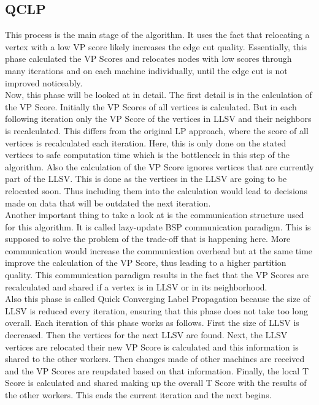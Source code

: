 \documentclass[acmsmall,nonacm,screen,review]{acmart}
\begin{document}
\subsection{QCLP}
This process is the main stage of the algorithm. It uses the fact that relocating a vertex with a low VP score likely increases the edge cut quality. Essentially, this phase calculated the VP Scores and relocates nodes with low scores through many iterations and on each machine individually, until the edge cut is not improved noticeably.\\
Now, this phase will be looked at in detail. The first detail is in the calculation of the VP Score. Initially the VP Scores of all vertices is calculated. But in each following iteration only the VP Score of the vertices in LLSV and their neighbors is recalculated. This differs from the original LP approach, where the score of all vertices is recalculated each iteration. Here, this is only done on the stated vertices to safe computation time which is the bottleneck in this step of the algorithm. Also the calculation of the VP Score ignores vertices that are currently part of the LLSV. This is done as the vertices in the LLSV are going to be relocated soon. Thus including them into the calculation would lead to decisions made on data that will be outdated the next iteration.\\
Another important thing to take a look at is the communication structure used for this algorithm. It is called lazy-update BSP communication paradigm. This is supposed to solve the problem of the trade-off that is happening here. More communication would increase the communication overhead but at the same time improve the calculation of the VP Score, thus leading to a higher partition quality. This communication paradigm  results in the fact that the VP Scores are recalculated and shared if a vertex is in LLSV or in its neighborhood.\\
Also this phase is called Quick Converging Label Propagation because the size of LLSV is reduced every iteration, ensuring that this phase does not take too long overall. Each iteration of this phase works as follows. First the size of LLSV is decreased. Then the vertices for the next LLSV are found. Next, the LLSV vertices are relocated their new VP Score is calculated and this information is shared to the other workers. Then changes made of other machines are received and the VP Scores are reupdated based on that information. Finally, the local T Score is calculated and shared making up the overall T Score with the results of the other workers. This ends the current iteration and the next begins.
\end{document}
